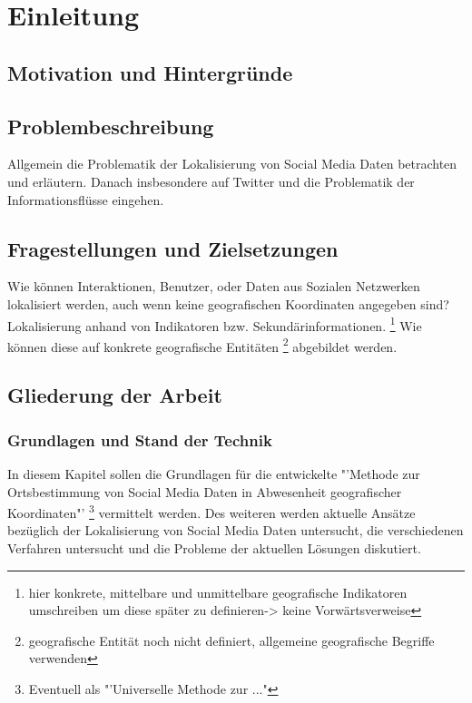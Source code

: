 \chapter{Einleitung}

	\section{Motivation und Hintergründe}

	\section{Problembeschreibung} 
	Allgemein die Problematik der Lokalisierung von Social Media Daten betrachten und erläutern.
	Danach insbesondere auf Twitter und die Problematik der Informationsflüsse eingehen.

	\section{Fragestellungen und Zielsetzungen}
	Wie können Interaktionen, Benutzer, oder Daten aus Sozialen Netzwerken lokalisiert werden, auch wenn keine geografischen Koordinaten angegeben sind? 
	Lokalisierung anhand von Indikatoren bzw. Sekundärinformationen.
	\footnote{hier konkrete, mittelbare und unmittelbare geografische Indikatoren umschreiben um diese später zu definieren-> keine Vorwärtsverweise} 
	Wie können diese auf konkrete geografische Entitäten \footnote{geografische Entität noch nicht definiert, allgemeine geografische Begriffe verwenden}  abgebildet werden. 

	\section{Gliederung der Arbeit}

		\subsection{Grundlagen und Stand der Technik}
			In diesem Kapitel sollen die Grundlagen für die entwickelte "'Methode zur Ortsbestimmung von Social Media Daten in Abwesenheit geografischer Koordinaten"' \footnote{Eventuell als "'Universelle Methode zur ..."} vermittelt werden. 
			Des weiteren werden aktuelle Ansätze bezüglich der Lokalisierung von Social Media Daten untersucht, die verschiedenen Verfahren untersucht und die Probleme der aktuellen Lösungen diskutiert.

